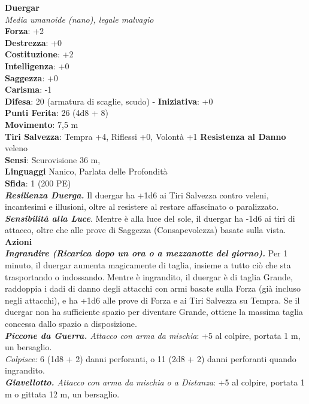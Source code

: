\begin{multicols}{2}
\medskip\textbf{Duergar}\\
\emph{Media umanoide (nano), legale malvagio}\\
\textbf{Forza}: +2\\
\textbf{Destrezza}: +0\\
\textbf{Costituzione}: +2\\
\textbf{Intelligenza}: +0\\
\textbf{Saggezza}: +0\\
\textbf{Carisma}: -1\\
\textbf{Difesa}: 20 (armatura di scaglie, scudo) - \textbf{Iniziativa}: +0\\
\textbf{Punti Ferita}: 26 (4d8 + 8)\\
\textbf{Movimento}: 7,5 m\\
\textbf{Tiri Salvezza}: Tempra +4, Riflessi +0, Volontà +1
\textbf{Resistenza al Danno} veleno\\
\textbf{Sensi}: Scurovisione 36 m, \\
\textbf{Linguaggi} Nanico, Parlata delle Profondità\\
\textbf{Sfida}: 1 (200 PE)\smallskip\\
\emph{\textbf{Resilienza Duerga.}} Il duergar ha +1d6 ai Tiri Salvezza contro veleni, incantesimi e illusioni, oltre al resistere al restare affascinato o paralizzato.\\
\emph{\textbf{Sensibilità alla Luce}}. Mentre è alla luce del sole, il duergar ha -1d6 ai tiri di attacco, oltre che alle prove di Saggezza (Consapevolezza) basate sulla vista.\\
\smallskip\textbf{Azioni}\\
\emph{\textbf{Ingrandire (Ricarica dopo un ora o a mezzanotte del giorno).}} Per 1 minuto, il duergar aumenta magicamente di taglia, insieme a tutto ciò che sta trasportando o indossando. Mentre è ingrandito, il duergar è di taglia Grande, raddoppia i dadi di danno degli attacchi con armi basate sulla Forza (già incluso negli attacchi), e ha +1d6 alle prove di Forza e ai Tiri Salvezza su Tempra. Se il duergar non ha sufficiente spazio per diventare Grande, ottiene la massima taglia concessa dallo spazio a disposizione.\\
\emph{\textbf{Piccone da Guerra.} Attacco con arma da mischia}: +5 al colpire, portata 1 m, un bersaglio.\\
\emph{Colpisce:} 6 (1d8 + 2) danni perforanti, o 11 (2d8 + 2) danni perforanti quando ingrandito.\\
\emph{\textbf{Giavellotto.} Attacco con arma da mischia o a Distanza}: +5 al colpire, portata 1 m o gittata 12 m, un bersaglio.\\

\end{multicols}

